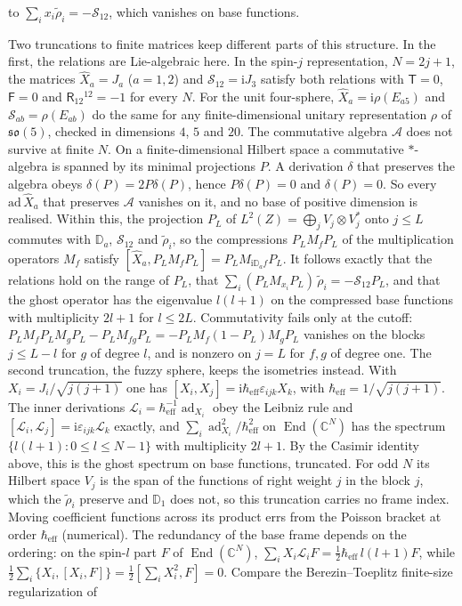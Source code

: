 to \(\sum_ix_i\tilde\rho_i=-\mathcal S_{12}\), which vanishes on base functions.

Two truncations to finite matrices keep different parts of this structure. In the first, the relations are Lie-algebraic here. In the spin-\(j\) representation, \(N=2j+1\), the matrices \(\hat X_a=J_a\) (\(a=1,2\)) and \(\mathcal S_{12}=\mathrm iJ_3\) satisfy both relations with \(\mathsf T=0\), \(\mathsf F=0\) and \(\mathsf R_{12}{}^{12}=-1\) for every \(N\). For the unit four-sphere, \(\hat X_a=\mathrm i\rho(E_{a5})\) and \(\mathcal S_{ab}=\rho(E_{ab})\) do the same for any finite-dimensional unitary representation \(\rho\) of \(\mathfrak{so}(5)\), checked in dimensions \(4\), \(5\) and \(20\). The commutative algebra \(\mathcal A\) does not survive at finite \(N\). On a finite-dimensional Hilbert space a commutative \(*\)-algebra is spanned by its minimal projections \(P\). A derivation \(\delta\) that preserves the algebra obeys \(\delta(P)=2P\delta(P)\), hence \(P\delta(P)=0\) and \(\delta(P)=0\). So every \(\mathrm{ad}\,\hat X_a\) that preserves \(\mathcal A\) vanishes on it, and no base of positive dimension is realised. Within this, the projection \(P_L\) of \(L^2(Z)=\bigoplus_jV_j\otimes V_j^*\) onto \(j\le L\) commutes with \(\mathbb D_a\), \(\mathcal S_{12}\) and \(\tilde\rho_i\), so the compressions \(P_LM_fP_L\) of the multiplication operators \(M_f\) satisfy \([\hat X_a,P_LM_fP_L]=P_LM_{\mathrm i\mathbb D_af}P_L\). It follows exactly that the relations hold on the range of \(P_L\), that \(\sum_i(P_LM_{x_i}P_L)\,\tilde\rho_i=-\mathcal S_{12}P_L\), and that the ghost operator has the eigenvalue \(l(l+1)\) on the compressed base functions with multiplicity \(2l+1\) for \(l\le2L\). Commutativity fails only at the cutoff: \(P_LM_fP_LM_gP_L-P_LM_{fg}P_L=-P_LM_f(1-P_L)M_gP_L\) vanishes on the blocks \(j\le L-l\) for \(g\) of degree \(l\), and is nonzero on \(j=L\) for \(f,g\) of degree one. The second truncation, the fuzzy sphere, keeps the isometries instead. With \(X_i=J_i/\sqrt{j(j+1)}\) one has \([X_i,X_j]=\mathrm i\hbar_{\mathrm{eff}}\varepsilon_{ijk}X_k\), with \(\hbar_{\mathrm{eff}}=1/\sqrt{j(j+1)}\). The inner derivations \(\mathcal L_i=\hbar_{\mathrm{eff}}^{-1}\operatorname{ad}_{X_i}\) obey the Leibniz rule and \([\mathcal L_i,\mathcal L_j]=\mathrm i\varepsilon_{ijk}\mathcal L_k\) exactly, and \(\sum_i\operatorname{ad}_{X_i}^2/\hbar_{\mathrm{eff}}^2\) on \(\operatorname{End}(\mathbb C^N)\) has the spectrum \(\{l(l+1):0\le l\le N-1\}\) with multiplicity \(2l+1\). By the Casimir identity above, this is the ghost spectrum on base functions, truncated. For odd \(N\) its Hilbert space \(V_j\) is the span of the functions of right weight \(j\) in the block \(j\), which the \(\tilde\rho_i\) preserve and \(\mathbb D_1\) does not, so this truncation carries no frame index. Moving coefficient functions across its product errs from the Poisson bracket at order \(\hbar_{\mathrm{eff}}\) (numerical). The redundancy of the base frame depends on the ordering: on the spin-\(l\) part \(F\) of \(\operatorname{End}(\mathbb C^N)\), \(\sum_iX_i\mathcal L_iF=\tfrac12\hbar_{\mathrm{eff}}\,l(l+1)F\), while \(\tfrac12\sum_i\{X_i,[X_i,F]\}=\tfrac12[\sum_iX_i^2,F]=0\). Compare the Berezin--Toeplitz finite-size regularization of 